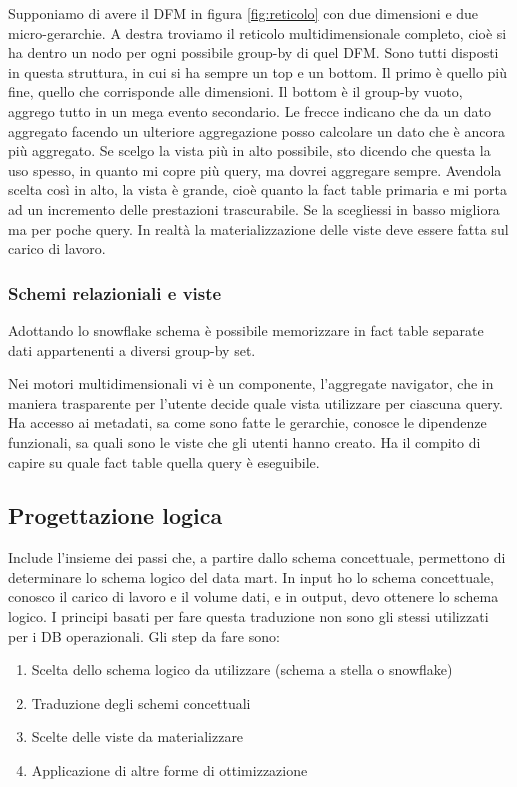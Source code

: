 Supponiamo di avere il DFM in figura \ref{fig:reticolo} con due dimensioni e due micro-gerarchie. A destra troviamo il reticolo multidimensionale completo, cioè si ha dentro un nodo per ogni possibile group-by di quel DFM. Sono tutti disposti in questa struttura, in cui si ha sempre un top e un bottom. Il primo è quello più fine, quello che corrisponde alle dimensioni. Il bottom è il group-by vuoto, aggrego tutto in un mega evento secondario. Le frecce indicano che da un dato aggregato facendo un ulteriore aggregazione posso calcolare un dato che è ancora più aggregato. Se scelgo la vista più in alto possibile, sto dicendo che questa la uso spesso, in quanto mi copre più query, ma dovrei aggregare sempre. Avendola scelta così in alto, la vista è grande, cioè quanto la fact table primaria e mi porta ad un incremento delle prestazioni trascurabile. Se la scegliessi in basso migliora ma per poche query. In realtà la materializzazione delle viste deve essere fatta sul carico di lavoro. 
\subsubsection{Schemi relazioniali e viste}
Adottando lo snowflake schema è possibile memorizzare in fact table separate dati appartenenti a diversi group-by set.


Nei motori multidimensionali vi è un componente, l’aggregate navigator, che in maniera trasparente per l’utente decide quale vista utilizzare per ciascuna query. Ha accesso ai metadati, sa come sono fatte le gerarchie, conosce le dipendenze funzionali, sa quali sono le viste che gli utenti hanno creato. Ha il compito di capire su quale fact table quella query è eseguibile.

\subsection{Progettazione logica}
Include l’insieme dei passi che, a partire dallo schema concettuale, permettono di determinare lo schema logico del data mart. In input ho lo schema concettuale, conosco il carico di lavoro e il volume dati, e in output, devo ottenere lo schema logico. I principi basati per fare questa traduzione non sono gli stessi utilizzati per i DB operazionali. Gli step da fare sono:
\begin{enumerate}
	\item
	Scelta dello schema logico da utilizzare (schema a stella o snowflake) 
	\item 
	Traduzione degli schemi concettuali
	\item 
	Scelte delle viste da materializzare
	\item 
	Applicazione di altre forme di ottimizzazione
\end{enumerate}

